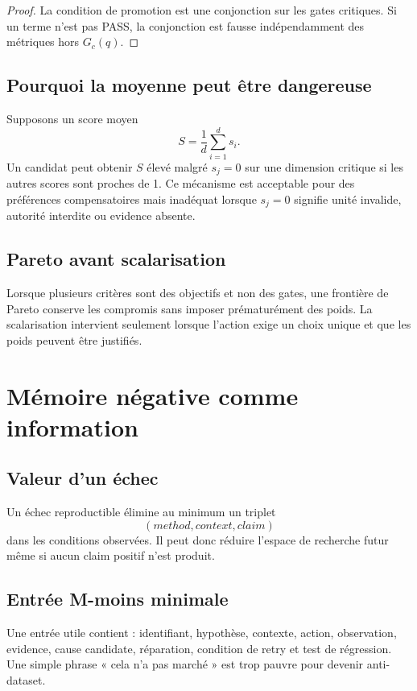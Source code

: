 \begin{proof}
La condition de promotion est une conjonction sur les gates critiques. Si un terme n'est pas PASS, la conjonction est fausse indépendamment des métriques hors $G_c(q)$.
\end{proof}

\section{Pourquoi la moyenne peut être dangereuse}

Supposons un score moyen
\[
S=\frac1d\sum_{i=1}^d s_i.
\]
Un candidat peut obtenir $S$ élevé malgré $s_j=0$ sur une dimension critique si les autres scores sont proches de 1. Ce mécanisme est acceptable pour des préférences compensatoires mais inadéquat lorsque $s_j=0$ signifie unité invalide, autorité interdite ou evidence absente.

\section{Pareto avant scalarisation}

Lorsque plusieurs critères sont des objectifs et non des gates, une frontière de Pareto conserve les compromis sans imposer prématurément des poids. La scalarisation intervient seulement lorsque l'action exige un choix unique et que les poids peuvent être justifiés.

\chapter{Mémoire négative comme information}

\section{Valeur d'un échec}

Un échec reproductible élimine au minimum un triplet
\[
(method,context,claim)
\]
dans les conditions observées. Il peut donc réduire l'espace de recherche futur même si aucun claim positif n'est produit.

\section{Entrée M-moins minimale}

Une entrée utile contient : identifiant, hypothèse, contexte, action, observation, evidence, cause candidate, réparation, condition de retry et test de régression. Une simple phrase « cela n'a pas marché » est trop pauvre pour devenir anti-dataset.

